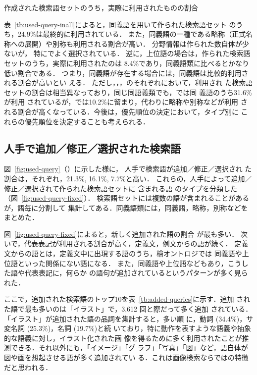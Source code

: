\documentclass[japanese]{jnlp_1.4}
\newcommand{\izs}[1]{}
\newcommand{\refsec}[1]{}
\newcommand{\MAJOR}{}
\newcommand{\MINOR}{}
\newcommand{\MONO}{}
\begin{document}
\begin{table}[t]
\caption{作成された検索語セットのうち，実際に利用されたものの割合}
\label{tb:used-query-inall}

\end{table}

表~\ref{tb:used-query-inall}によると，同義語を用いて作られた検索語セット
のうち，24.9\%は最終的に利用されている．
また，同義語の一種である略称（正式名称への展開）や別称も利用される割合が高い．
分野情報は作られた数自体が少ないが，
特に\MINOR{}でよく選択されている．
逆に，上位語の場合は，作られた検索語セットのうち，実際に利用されたのは
8.4\%であり，同義語類に比べるとかなり低い割合である．
つまり，同義語が存在する場合には，同義語は比較的利用される割合が高いとい
える．
ただし，\MONO{}，\MAJOR{}，\MINOR{}のそれぞれにおいて，利用され
た検索語セットの割合は相当異なっており，同じ同語義類でも，\MONO{}では同
義語のうち31.6\%が利用
されているが，\MINOR{}では10.2\%に留まり，代わりに略称や別称などが利用
される割合が高くなっている．今後は，優先順位の決定において，タイプ別に
これらの優先順位を決定することも考えられる．


\subsection{人手で追加／修正／選択された検索語}
\label{sec:ana-add-fixed}

図~\ref{fig:used-query}（\refsec{sec:ana-query}）に示した様に，
人手で検索語が追加／修正／選択され
た割合は，それぞれ，21.3\%, 16.1\%, 7.7\%と高い．
これらの，人手によって追加／修正／選択されて作られた検索語セットに
含まれる語
のタイプを分類した（図~\ref{fig:used-query-fixed}）．
検索語セットには複数の語が含まれることがあるが，語毎に分割して
集計してある．同義語類には，同義語，略称，別称などをまとめた．

図~\ref{fig:used-query-fixed}によると，新しく追加された語の割合
が最も多い．
次いで，代表表記が利用される割合が高く，定義文，例文からの語が続く．
定義文からの語とは，定義文中に出現する語のうち，檜オントロジでは
同義語や上位語といった関係にない語になる．
また，同義語や上位語などもあり，こうした語や代表表記に，何らか
の語句が追加されているというパターンが多く見られた．

ここで，追加された検索語のトップ10を表~\ref{tb:added-queries}に示す．追加
された語で最も多いのは「イラスト」で，3,612 回と際だって多く追加
されている．「イラスト」が追加された語の品詞を集計すると，多い順
に，動詞 (34.4\%)，サ変名詞 (25.3\%)，名詞\izs{1000:抽象} (19.7\%)と続
いており，特に動作を表すような語義や抽象的な語義に対し，イラスト化された画
像を得るために多く利用されたことが推測できる．それ以外にも，「イメージ」「グ
ラフ」「写真」「図」など，語自体が図や画を想起させる語が多く追加されてい
る．これは画像検索ならではの特徴だと思われる．
\end{document}
